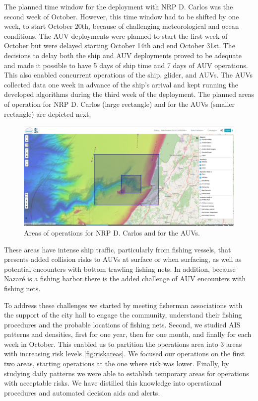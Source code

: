 The planned time window for the \proj deployment with NRP D. Carlos was
the second week of October. However, this time window had to be shifted
by one week, to start October 20th, because of challenging
meteorological and ocean conditions. The AUV deployments were planned to
start the first week of October but were delayed starting October 14th
and end October 31st. The decisions to delay both the ship and AUV
deployments proved to be adequate and made it possible to have 5 days of
ship time and 7 days of AUV operations. This also enabled concurrent
operations of the ship, glider, and AUVs. The AUVs collected data one
week in advance of the ship’s arrival and kept running the developed
algorithms during the third week of the deployment. The planned areas of
operation for NRP D. Carlos (large rectangle) and for the AUVs (smaller
rectangle) are depicted next.

\begin{figure}
    \centering
    \includegraphics[width=.7\linewidth]{fig/Opareaas.png}
    \caption{Areas of operations for NRP D. Carlos and for the AUVs.}
    \label{fig:opareas}
\end{figure}

These areas have intense ship traffic, particularly from fishing
vessels, that presents added collision risks to AUVs at surface or when
surfacing, as well as potential encounters with bottom trawling fishing
nets. In addition, because Nazaré is a fishing harbor there is the added
challenge of AUV encounters with fishing nets.

To address these challenges we started by meeting fisherman associations
with the support of the city hall to engage the community, understand
their fishing procedures and the probable locations of fishing nets.
Second, we studied AIS patterns and densities, first for one year, then
for one month, and finally for each week in October. This enabled us to
partition the operations area into 3 areas with increasing risk levels
\ref{fig:riskareas}. We focused our operations on the first two areas,
starting operations at the one where risk was lower. Finally, by
studying daily patterns we were able to establish temporary areas for
operations with acceptable risks. We have distilled this knowledge into
operational procedures and automated decision aids and alerts.

